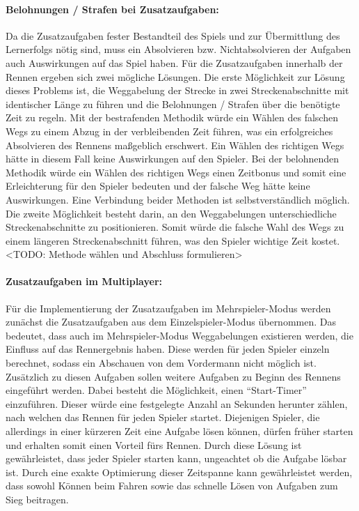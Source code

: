 		\paragraph{Belohnungen / Strafen bei Zusatzaufgaben:}
		Da die Zusatzaufgaben fester Bestandteil des Spiels und zur Übermittlung des Lernerfolgs nötig sind, muss ein Absolvieren bzw. Nichtabsolvieren der Aufgaben auch Auswirkungen auf das Spiel haben. Für die Zusatzaufgaben innerhalb der Rennen ergeben sich zwei mögliche Lösungen.
		Die erste Möglichkeit zur Lösung dieses Problems ist, die Weggabelung der Strecke in zwei Streckenabschnitte mit identischer Länge zu führen und die Belohnungen / Strafen über die benötigte Zeit zu regeln. Mit der bestrafenden Methodik würde ein Wählen des falschen Wegs zu einem Abzug in der verbleibenden Zeit führen, was ein erfolgreiches Absolvieren des Rennens maßgeblich erschwert. Ein Wählen des richtigen Wegs hätte in diesem Fall keine Auswirkungen auf den Spieler.
		Bei der belohnenden Methodik würde ein Wählen des richtigen Wegs einen Zeitbonus und somit eine Erleichterung für den Spieler bedeuten und der falsche Weg hätte keine Auswirkungen. Eine Verbindung beider Methoden ist selbstverständlich möglich.
		Die zweite Möglichkeit besteht darin, an den Weggabelungen unterschiedliche Streckenabschnitte zu positionieren. Somit würde die falsche Wahl des Wegs zu einem längeren Streckenabschnitt führen, was den Spieler wichtige Zeit kostet.
		<TODO: Methode wählen und Abschluss formulieren>

		\paragraph{Zusatzaufgaben im Multiplayer:}
		Für die Implementierung der Zusatzaufgaben im Mehrspieler-Modus werden zunächst die Zusatzaufgaben aus dem Einzelspieler-Modus übernommen. Das bedeutet, dass auch im Mehrspieler-Modus Weggabelungen existieren werden, die Einfluss auf das Rennergebnis haben. Diese werden für jeden Spieler einzeln berechnet, sodass ein Abschauen von dem Vordermann nicht möglich ist. Zusätzlich zu diesen Aufgaben sollen weitere Aufgaben zu Beginn des Rennens eingeführt werden. Dabei besteht die Möglichkeit, einen \enquote{Start-Timer} einzuführen. Dieser würde eine festgelegte Anzahl an Sekunden herunter zählen, nach welchen das Rennen für jeden Spieler startet. Diejenigen Spieler, die allerdings in einer kürzeren Zeit eine Aufgabe lösen können, dürfen früher starten und erhalten somit einen Vorteil fürs Rennen.
		Durch diese Lösung ist gewährleistet, dass jeder Spieler starten kann, ungeachtet ob die Aufgabe lösbar ist. Durch eine exakte Optimierung dieser Zeitspanne kann gewährleistet werden, dass sowohl Können beim Fahren sowie das schnelle Lösen von Aufgaben zum Sieg beitragen.

